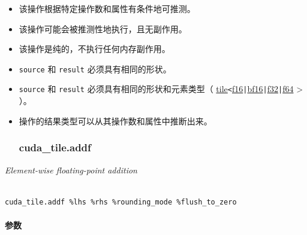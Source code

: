 \documentclass{article}
\begin{document}
\begin{itemize}
\item 该操作根据特定操作数和属性有条件地可推测。
\item 该操作可能会被推测性地执行，且无副作用。
\item 该操作是纯的，不执行任何内存副作用。
\item \texttt{source} 和 \texttt{result} 必须具有相同的形状。
\item \texttt{source} 和 \texttt{result} 必须具有相同的形状和元素类型（ \href{https://docs.nvidia.com/cuda/tile-ir/latest/sections/types.html#type-tile}{tile}\texttt{<}\href{https://docs.nvidia.com/cuda/tile-ir/latest/sections/types.html#subsection-element-types}{f16}\texttt{|}\href{https://docs.nvidia.com/cuda/tile-ir/latest/sections/types.html#subsection-element-types}{bf16}\texttt{|}\href{https://docs.nvidia.com/cuda/tile-ir/latest/sections/types.html#subsection-element-types}{f32}\texttt{|}\href{https://docs.nvidia.com/cuda/tile-ir/latest/sections/types.html#subsection-element-types}{f64} > ）。
\item 操作的结果类型可以从其操作数和属性中推断出来。




\subsubsection{cuda\_tile.addf}


\end{itemize}
\textit{Element-wise floating-point addition}




\begin{lstlisting}

cuda_tile.addf %lhs %rhs %rounding_mode %flush_to_zero

\end{lstlisting}



\paragraph{参数}
\end{document}
